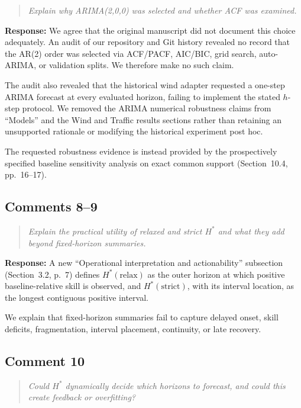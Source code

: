 \documentclass[11pt,a4paper]{article}
\newenvironment{reviewcomment}
  {\begin{quote}\itshape}
  {\end{quote}}
\newcommand{\response}{\noindent\textbf{Response:} }
\begin{document}
\begin{reviewcomment}
Explain why ARIMA(2,0,0) was selected and whether ACF was examined.
\end{reviewcomment}

\response
We agree that the original manuscript did not document this choice adequately.
An audit of our repository and Git history revealed no record that the AR(2)
order was selected via ACF/PACF, AIC/BIC, grid search, auto-ARIMA, or validation
splits. We therefore make no such claim.

The audit also revealed that the historical wind adapter requested a one-step
ARIMA forecast at every evaluated horizon, failing to implement the stated
$h$-step protocol. We removed the ARIMA numerical robustness claims from
``Models'' and the Wind and Traffic results sections rather than retaining an
unsupported rationale or modifying the historical experiment post hoc.

The requested robustness evidence is instead provided by the prospectively
specified baseline sensitivity analysis on exact common support
(Section~10.4, pp.~16--17).


\subsection*{Comments 8--9}

\begin{reviewcomment}
Explain the practical utility of relaxed and strict $H^*$ and what they add
beyond fixed-horizon summaries.
\end{reviewcomment}

\response
A new ``Operational interpretation and actionability'' subsection
(Section~3.2, p.~7) defines $H^*(\mathrm{relax})$ as the outer horizon at
which positive baseline-relative skill is observed, and $H^*(\mathrm{strict})$,
with its interval location, as the longest contiguous positive interval.

We explain that fixed-horizon summaries fail to capture delayed onset, skill
deficits, fragmentation, interval placement, continuity, or late recovery.


\subsection*{Comment 10}

\begin{reviewcomment}
Could $H^*$ dynamically decide which horizons to forecast, and could this
create feedback or overfitting?
\end{reviewcomment}
\end{document}
